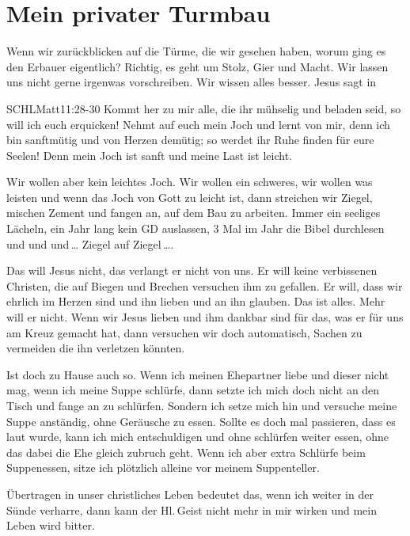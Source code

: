 \documentclass[14pt]{../../inc/mybib}
\newenvironment{block}[1][]{%
  \vspace{1.5em}%
  \noindent\textbf{#1}\par%
  \vspace{0.0em}%
}{%
  \vspace{1em}%
}
\begin{document}
    \section{Mein privater Turmbau}
\begin{block}
    Wenn wir zurückblicken auf die Türme, die wir gesehen haben, worum ging es den Erbauer eigentlich? Richtig, es geht um Stolz, Gier und Macht. Wir lassen uns nicht gerne irgenwas vorschreiben. Wir wissen alles besser. Jesus sagt in  
    \begin{bibelbox}{SCHL}{Matt}{11:28-30}
        Kommt her zu mir alle, die ihr mühselig und beladen seid, so will ich euch erquicken!
        Nehmt auf euch mein Joch und lernt von mir, denn ich bin sanftmütig und von Herzen demütig; so werdet ihr Ruhe finden für eure Seelen!
        Denn mein Joch ist sanft und meine Last ist leicht.
    \end{bibelbox}  
    Wir wollen aber kein leichtes Joch. Wir wollen ein schweres, wir wollen was leisten und wenn das Joch von Gott zu leicht ist, dann streichen wir Ziegel, mischen Zement und fangen an, auf dem Bau zu arbeiten. Immer ein seeliges Lächeln, ein Jahr lang kein GD auslassen, 3 Mal im Jahr die Bibel durchlesen und und und\,\dots{} Ziegel auf Ziegel\,\dots{}.
\end{block}
\begin{block}
    Das will Jesus nicht, das verlangt er nicht von uns. Er will keine verbissenen Christen, die auf Biegen und Brechen versuchen ihm zu gefallen. Er will, dass wir ehrlich im Herzen sind und ihn lieben und an ihn glauben. Das ist alles. Mehr will er nicht. Wenn wir Jesus lieben und ihm dankbar sind für das, was er für uns am Kreuz gemacht hat, dann versuchen wir doch automatisch, Sachen zu vermeiden die ihn verletzen könnten. 
    
    Ist doch zu Hause auch so. Wenn ich meinen Ehepartner liebe und dieser nicht mag, wenn ich meine Suppe schlürfe, dann setzte ich mich doch nicht an den Tisch und fange an zu schlürfen. Sondern ich setze mich hin und versuche meine Suppe anständig, ohne Geräusche zu essen. Sollte es doch mal passieren, dass es laut wurde, kann ich mich entschuldigen und ohne schlürfen weiter essen, ohne das dabei die Ehe gleich zubruch geht. Wenn ich aber extra Schlürfe beim Suppenessen, sitze ich plötzlich alleine vor meinem Suppenteller.

    Übertragen in unser christliches Leben bedeutet das, wenn ich weiter in der Sünde verharre, dann kann der Hl.\,Geist nicht mehr in mir wirken und mein Leben wird bitter.
\end{block}
\end{document}
